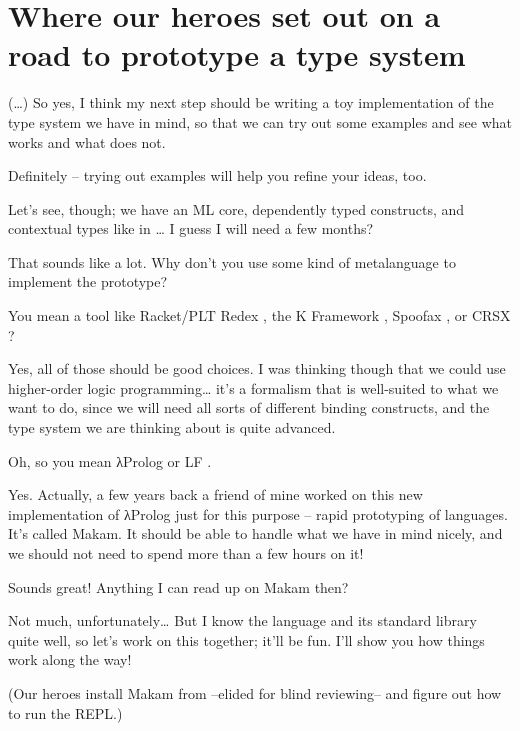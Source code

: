 \section{Where our heroes set out on a road to prototype a type
system}\label{where-our-heroes-set-out-on-a-road-to-prototype-a-type-system}

 (\ldots{}) So yes, I think my next step should be
writing a toy implementation of the type system we have in mind, so that
we can try out some examples and see what works and what does not.

 Definitely -- trying out examples will help you
refine your ideas, too.

\heroSTUDENT{} Let's see, though; we have an ML core, dependently typed
constructs, and contextual types like in
\citet{nanevski2008contextual}\ldots{} I guess I will need a few months?

\heroADVISOR{} That sounds like a lot. Why don't you use some kind of
metalanguage to implement the prototype?

\heroSTUDENT{} You mean a tool like Racket/PLT Redex
\citep{tobin2011languages,felleisen2009semantics}, the K Framework
\citep{rosu2010overview,ellison2009rewriting}, Spoofax
\citep{kats2010spoofax}, or CRSX \citep{rose2011crsx}?

\heroADVISOR{} Yes, all of those should be good choices. I was thinking though
that we could use higher-order logic programming\ldots{} it's a
formalism that is well-suited to what we want to do, since we will need
all sorts of different binding constructs, and the type system we are
thinking about is quite advanced.

\heroSTUDENT{} Oh, so you mean \foreignlanguage{greek}{λ}Prolog \citep{miller1988overview} or LF
\citep{pfenning1999system}.

\heroADVISOR{} Yes. Actually, a few years back a friend of mine worked on this
new implementation of \foreignlanguage{greek}{λ}Prolog just for this purpose -- rapid prototyping
of languages. It's called Makam. It should be able to handle what we
have in mind nicely, and we should not need to spend more than a few
hours on it!

\heroSTUDENT{} Sounds great! Anything I can read up on Makam then?

\heroADVISOR{} Not much, unfortunately\ldots{} But I know the language and its
standard library quite well, so let's work on this together; it'll be
fun. I'll show you how things work along the way!

\begin{scenecomment}
(Our heroes install Makam from --elided for blind reviewing-- and figure out how to run the REPL.)
\end{scenecomment}

